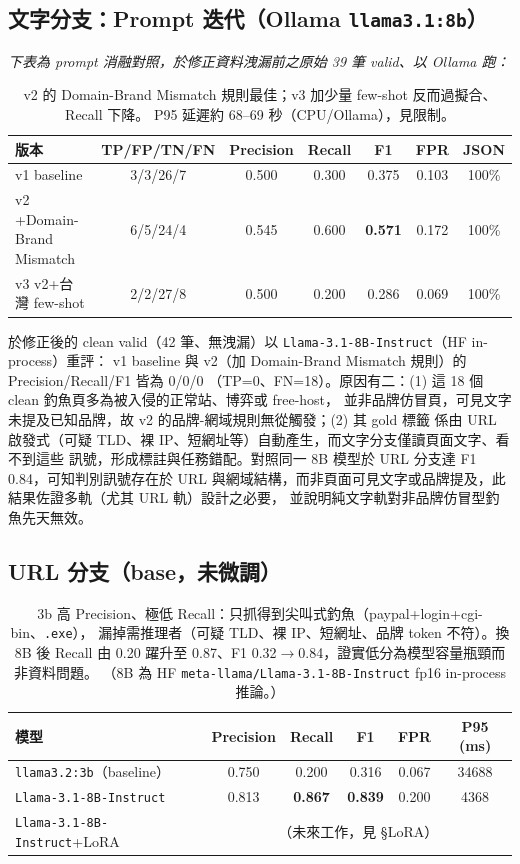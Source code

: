 \documentclass[11pt]{ctexart}
\begin{document}
\subsection{文字分支：Prompt 迭代（Ollama \texttt{llama3.1:8b}）}
\textit{下表為 prompt 消融對照，於修正資料洩漏前之原始 39 筆 valid、以 Ollama 跑：}
\begin{table}[h]
\centering
\begin{tabular}{lcccccc}
\toprule
\textbf{版本} & \textbf{TP/FP/TN/FN} & \textbf{Precision} & \textbf{Recall} & \textbf{F1} & \textbf{FPR} & \textbf{JSON} \\
\midrule
v1 baseline & 3/3/26/7 & 0.500 & 0.300 & 0.375 & 0.103 & 100\% \\
v2 +Domain-Brand Mismatch & 6/5/24/4 & 0.545 & 0.600 & \textbf{0.571} & 0.172 & 100\% \\
v3 v2+台灣 few-shot & 2/2/27/8 & 0.500 & 0.200 & 0.286 & 0.069 & 100\% \\
\bottomrule
\end{tabular}
\caption{v2 的 Domain-Brand Mismatch 規則最佳；v3 加少量 few-shot 反而過擬合、Recall 下降。
P95 延遲約 68--69 秒（CPU/Ollama），見限制。}
\end{table}

於修正後的 clean valid（42 筆、無洩漏）以 \texttt{Llama-3.1-8B-Instruct}（HF in-process）重評：
v1 baseline 與 v2（加 Domain-Brand Mismatch 規則）的 Precision/Recall/F1 皆為 0/0/0
（TP=0、FN=18）。原因有二：(1) 這 18 個 clean 釣魚頁多為被入侵的正常站、博弈或 free-host，
並非品牌仿冒頁，可見文字未提及已知品牌，故 v2 的品牌-網域規則無從觸發；(2) 其 gold 標籤
係由 URL 啟發式（可疑 TLD、裸 IP、短網址等）自動產生，而文字分支僅讀頁面文字、看不到這些
訊號，形成標註與任務錯配。對照同一 8B 模型於 URL 分支達 F1 0.84，可知判別訊號存在於
URL 與網域結構，而非頁面可見文字或品牌提及，此結果佐證多軌（尤其 URL 軌）設計之必要，
並說明純文字軌對非品牌仿冒型釣魚先天無效。

\subsection{URL 分支（base，未微調）}
\begin{table}[h]
\centering
\begin{tabular}{lccccc}
\toprule
\textbf{模型} & \textbf{Precision} & \textbf{Recall} & \textbf{F1} & \textbf{FPR} & \textbf{P95 (ms)} \\
\midrule
\texttt{llama3.2:3b}（baseline） & 0.750 & 0.200 & 0.316 & 0.067 & 34688 \\
\texttt{Llama-3.1-8B-Instruct} & 0.813 & \textbf{0.867} & \textbf{0.839} & 0.200 & 4368 \\
\texttt{Llama-3.1-8B-Instruct}+LoRA & \multicolumn{5}{c}{（未來工作，見 §LoRA）} \\
\bottomrule
\end{tabular}
\caption{3b 高 Precision、極低 Recall：只抓得到尖叫式釣魚（paypal+login+cgi-bin、\texttt{.exe}），
漏掉需推理者（可疑 TLD、裸 IP、短網址、品牌 token 不符）。換 8B 後 Recall 由 0.20 躍升至
0.87、F1 0.32$\rightarrow$0.84，證實低分為模型容量瓶頸而非資料問題。
（8B 為 HF \texttt{meta-llama/Llama-3.1-8B-Instruct} fp16 in-process 推論。）}
\end{table}
\end{document}
